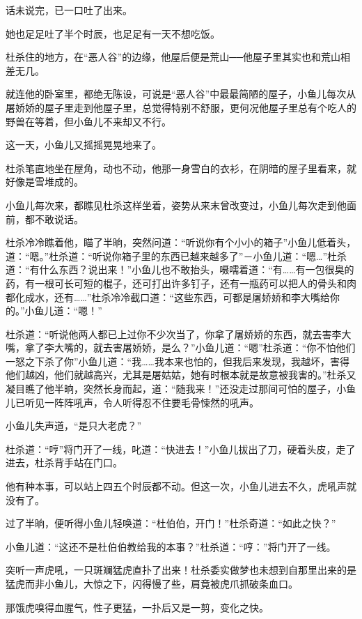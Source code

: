 \documentclass[12pt,oneside]{book}
\begin{document}
话未说完，已一口吐了出来。

她也足足吐了半个时辰，也足足有一天不想吃饭。

杜杀住的地方，在``恶人谷''的边缘，他屋后便是荒山──他屋子里其实也和荒山相差无几。

就连他的卧室里，都绝无陈设，可说是``恶人谷''中最最简陋的屋子，小鱼儿每次从屠娇娇的屋子里走到他屋子里，总觉得特别不舒服，更何况他屋子里总有个吃人的野兽在等着，但小鱼儿不来却又不行。

这一天，小鱼儿又摇摇晃晃地来了。

杜杀笔直地坐在屋角，动也不动，他那一身雪白的衣衫，在阴暗的屋子里看来，就好像是雪堆成的。

小鱼儿每次来，都瞧见杜杀这样坐着，姿势从来末曾改变过，小鱼儿每次走到他面前，都不敢说话。

杜杀冷冷瞧着他，瞄了半晌，突然问道：``听说你有个小小的箱子''小鱼儿低着头，道：``嗯。''杜杀道：``听说你箱子里的东西已越来越多了''－小鱼儿道：``嗯\ldots{}''杜杀道：``有什么东西？说出来！''小鱼儿也不敢抬头，嗫嚅着道：``有\ldots\ldots 有一包很臭的药，有一根可长可短的棍子，还可打出许多钉子，还有一瓶药可以把人的骨头和肉都化成水，还有\ldots\ldots{}''杜杀冷冷截口道：``这些东西，可都是屠娇娇和李大嘴给你的。''小鱼儿道：``嗯！''

杜杀道：``听说他两人都已上过你不少次当了，你拿了屠娇娇的东西，就去害李大嘴，拿了李大嘴的，就去害屠娇娇，是么？''小鱼儿道：``嗯''杜杀道：``你不怕他们一怒之下杀了你''小鱼儿道：``我\ldots\ldots 我本来也怕的，但我后来发现，我越坏，害得他们越凶，他们就越高兴，尤其是屠姑姑，她有时根本就是故意被我害的。''杜杀又凝目瞧了他半晌，突然长身而起，道：``随我来！''还没走过那间可怕的屋子，小鱼儿已听见一阵阵吼声，令人听得忍不住要毛骨悚然的吼声。

小鱼儿失声道，``是只大老虎？''

杜杀道：``哼''将门开了一线，叱道：``快进去！''小鱼儿拔出了刀，硬着头皮，走了进去，杜杀背手站在门口。

他有种本事，可以站上四五个时辰都不动。但这一次，小鱼儿进去不久，虎吼声就没有了。

过了半晌，便听得小鱼儿轻唤道：``杜伯伯，开门！''杜杀奇道：``如此之快？''

小鱼儿道：``这还不是杜伯伯教给我的本事？''杜杀道：``哼：''将门开了一线。

突听一声虎吼，一只斑斓猛虎直扑了出来！杜杀委实做梦也未想到自那里出来的是猛虎而非小鱼儿，大惊之下，闪得慢了些，肩竟被虎爪抓破条血口。

那饿虎嗅得血腥气，性子更猛，一扑后又是一剪，变化之快。
\end{document}
